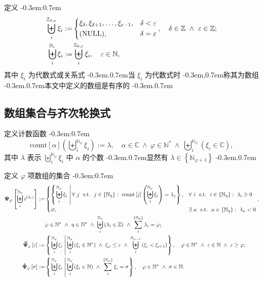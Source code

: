 \documentclass{article}
\newcommand\BrSetN[1]{\Set{\MathPartialSetN{#1}}}
\newcommand\InPartialSetN[2]{\InSet{#1}{\BrSetN{#2}}}
\newcommand\InSetC[1]{\InSet{#1}{\MathSetC}}
\newcommand\InSetN[1]{\InSet{#1}{\MathSetN}}
\newcommand\InSetU[1]{\InSet{#1}{\MathSetU}}
\newcommand\InSetZ[1]{\InSet{#1}{\MathSetZ}}
\newcommand\MathPartialSetN[1]{\mathbb{N}_{#1}}
\newcommand\MathPartialSetZ[2]{\mathbb{Z}_{\MultiSub{#1}{#2}}}
\newcommand\MathSetC{\mathbb{C}}
\newcommand\MathSetN{\mathbb{N}}
\newcommand\MathSetU{\mathbb{N}^{*}}
\newcommand\MathSetZ{\mathbb{Z}}
\newcommand\NormalSeqOfN[3]{\SeqOfN{#1}{#2}{#3_{#1}}}
\newcommand\NormalSeqOfZ[4]{\SeqOfZ{#1}{#2}{#3}{#4_{#1}}}
\newcommand\NormalSumOfN[3]{\SumOfN{#1}{#2}{#3_{#1}}}
\newcommand\SeqOfNInSetC[3]{\SeqOfN{#1}{#2}{\Bracket{\InSetC{#3_{#1}}}}}
\newcommand\SeqOfNInSetN[3]{\SeqOfN{#1}{#2}{\Bracket{\InSetN{#3_{#1}}}}}
\newcommand\SeqOfNInSetU[3]{\SeqOfN{#1}{#2}{\Bracket{\InSetU{#3_{#1}}}}}
\newcommand\SeqOfNInSetZ[3]{\SeqOfN{#1}{#2}{\Bracket{\InSetZ{#3_{#1}}}}}
\newcommand\SeqOfN[3]{\Seq{#1}{\MathPartialSetN{#2}}{#3}}
\newcommand\SeqOfZ[4]{\Seq{#1}{\MathPartialSetZ{#2}{#3}}{#4}}
\newcommand\SumOfN[3]{\Sum{#1}{\BrSetN{#2}}{#3}}
\newcommand\BoldPsi[2]{\BracketMidFunc{\Psi}{#1}{#2}}
\newcommand\BoldPsiHat[2]{\BracketMidFunc{\hat{\Psi}}{#1}{#2}}
\newcommand\BoldPsiSeq{\BoldPsi{\varphi}{\SeqLambda}}
\newcommand\BoldPsiVec[2]{\BracketMidFunc{\vec{\Psi}}{#1}{#2}}
\newcommand\Bracket[1]{\left( #1 \right)}
\newcommand\BracketBig[1]{\left\{ #1 \right\}}
\newcommand\BracketMid[1]{\left[ #1 \right]}
\newcommand\BracketMidFunc[3]{\bm{#1}_{#2} \BracketMid{#3}}
\newcommand\CaseDomain[1]{\DomainComma & #1}
\newcommand\Colon{:}
\newcommand\Comma{,}
\newcommand\CommaSub{\Comma}
\newcommand\Count{\text{count}}
\newcommand\DefineAs{:=}
\newcommand\Domain[1]{\DomainComma \quad #1}
\newcommand\DomainAnd{\LogicAnd}
\newcommand\DomainComma{\Comma}
\newcommand\EmptySet{\varnothing}
\newcommand\Exists[3]{\Satisfy{\exists}{#1}{#2}{#3}}
\newcommand\FlatSeqOfXi{\xi_{\delta} \SeqComma \xi_{\delta+1} \SeqComma \ldots \SeqComma \xi_{\varepsilon-1}}
\newcommand\ForAll[3]{\Satisfy{\forall}{#1}{#2}{#3}}
\newcommand\Func[2]{#1 \Bracket{#2}}
\newcommand\GrowSeq[2]{\SeqOfN{i}{#1-1}{\Bracket{#2_{i} < #2_{i+1}}}}
\newcommand\InSet[2]{#1 \in #2}
\newcommand\Logic[1]{\ #1\ }
\newcommand\LogicAnd{\Logic{\wedge}}
\newcommand\MultiSub[2]{#1 \CommaSub #2}
\newcommand\NumbersSeqLambda{\PowerBracket{i}{\lambda_{i}}}
\newcommand\PowerBracket[2]{#1^{\Bracket{#2}}}
\newcommand\Satisfy[4]{\Space{#1} #2 \SuchThat #3 \Space{\Colon} #4}
\newcommand\Seq[3]{\biguplus_{#1}^{#2} #3}
\newcommand\SeqComma{\Comma}
\newcommand\SeqLambda{\SeqOfN{i}{\eta}{\NumbersSeqLambda}}
\newcommand\SeqXi{\NormalSeqOfN{i}{\varphi}{\xi}}
\newcommand\Set[1]{\BracketBig{#1}}
\newcommand\SetDefAnd{\LogicAnd}
\newcommand\SetDefinition[2]{\Set{\left. #1 \ \right| #2}}
\newcommand\Space[1]{#1\ }
\newcommand\SuchThat{\Logic{\Logic{\text{s.t.}}}}
\newcommand\Sum[3]{\sum_{#1}^{#2} #3}
\newcommand\EqEndComma{\Comma}
\newcommand\EqEndPeriod{.}
\newcommand\EqEndSemicolon{;}
\newcommand\TextBracket[1]{(#1)}
\newcommand\TextColon{\TextPunctuation{\Colon}}
\newcommand\TextComma{\TextPunctuation{\Comma}}
\newcommand\TextPeriod{\TextPunctuation{.}}
\newcommand\TextPunctuation[1]{\kern -0.3em#1\kern 0.7em}
\begin{document}
	定义 \TextColon
	\begin{align*}
	\NormalSeqOfZ{i}{\delta}{\varepsilon}{\xi} \DefineAs &
	\begin{dcases}
	\FlatSeqOfXi \CaseDomain{\delta < \varepsilon} \\
	\text{\TextBracket{NULL}} \CaseDomain{\delta = \varepsilon}
	\end{dcases} \Domain{\InSetZ{\delta} \DomainAnd \InSetZ{\varepsilon}} \EqEndSemicolon \\
	\NormalSeqOfN{i}{\varepsilon}{\xi} \DefineAs & \NormalSeqOfZ{i}{0}{\varepsilon}{\xi} \Domain{\InSetN{\varepsilon}} \EqEndComma
	\end{align*}
	其中 $\xi_{i}$ 为代数式或关系式 \TextPeriod 当 $\xi_{i}$ 为代数式时 \TextComma 称其为数组 \TextPeriod 本文中定义的数组是有序的 \TextPeriod
	
	
	\subsection{数组集合与齐次轮换式} \label{sec:2.4}
	定义计数函数 \TextColon
	\begin{equation*}
	\Func{\Count \BracketMid{\alpha}}{\SeqXi} \DefineAs \lambda \Domain{\InSetC{\alpha} \DomainAnd \InSetU{\varphi} \DomainAnd \SeqOfNInSetC{i}{\varphi}{\xi}} \EqEndComma
	\end{equation*}
	其中 $\lambda$ 表示 $\SeqXi$ 中 $\alpha$ 的个数 \TextPeriod 显然有 $\InPartialSetN{\lambda}{\varphi+1}$ \TextPeriod
	
	定义 $\varphi$ 项数组的集合 \TextColon
	\begin{align*}
	\BoldPsiSeq \DefineAs &
	\begin{dcases}
	\SetDefinition{\SeqXi}{\ForAll{j}{\InPartialSetN{j}{\eta}}{\Func{\Count \BracketMid{j}}{\SeqXi} = \lambda_{j}}} \CaseDomain{\ForAll{i}{\InPartialSetN{i}{\eta}}{\lambda_{i} \geq 0}} \\
	\EmptySet \CaseDomain{\Exists{\kappa}{\InPartialSetN{\kappa}{\eta}}{\lambda_{\kappa} < 0}}
	\end{dcases} \DomainComma \\
	& \InSetU{\varphi} \DomainAnd \InSetU{\eta} \DomainAnd \SeqOfNInSetZ{i}{\eta}{\lambda} \DomainAnd \NormalSumOfN{i}{\eta}{\lambda} = \varphi \EqEndSemicolon \\
	\BoldPsiVec{\varphi}{\varepsilon} \DefineAs & \SetDefinition{\SeqXi}{\SeqOfNInSetU{i}{\varphi}{\xi} \SetDefAnd \xi_{\varphi} \leq \varepsilon \SetDefAnd \GrowSeq{\varphi}{\xi}} \Domain{\InSetU{\varphi} \DomainAnd \InSetN{\varepsilon} \DomainAnd \varepsilon \geq \varphi} \EqEndSemicolon \\
	\BoldPsiHat{\varphi}{\sigma} \DefineAs & \SetDefinition{\SeqXi}{\SeqOfNInSetN{i}{\varphi}{\xi} \SetDefAnd \NormalSumOfN{i}{\varphi}{\xi} = \sigma} \Domain{\InSetU{\varphi} \DomainAnd \InSetN{\sigma}} \EqEndPeriod
	\end{align*}
	
\end{document}
